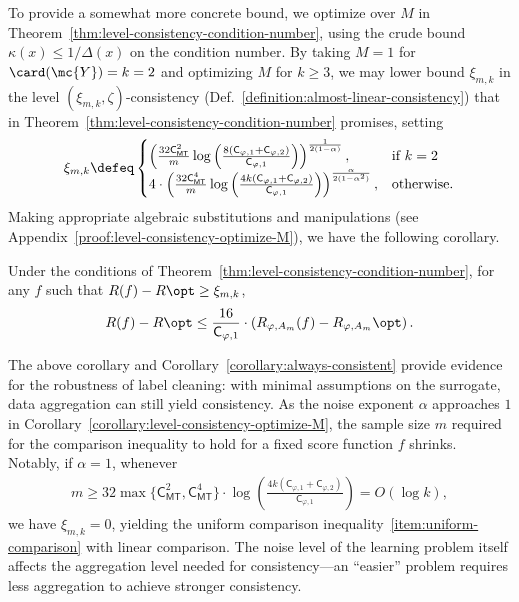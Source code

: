 \documentclass[11pt]{article}
\newcommand{\prn}[1]{\left({#1}\right)} %
\newcommand{\constant}{\mathsf{C}}  %
\newcommand{\cstMT}{\constant_{\mathsf{MT}}}
\newcommand{\sloss}{\varphi}  %
\begin{document}
To provide a somewhat more concrete bound, we optimize
over $M$ in Theorem~\ref{thm:level-consistency-condition-number},
using the crude bound $\kappa(x) \leq 1/\Delta(x)$ on the condition
number.
%
By taking $M=1$ for $\card(\mc{Y}) = k =2$ and optimizing $M$ for $k \geq3$,
we may lower bound $\xi_{m,k}$ in the level $(\xi_{m,k}, \zeta)$-consistency
(Def.~\ref{definition:almost-linear-consistency}) that in
Theorem~\ref{thm:level-consistency-condition-number} promises, setting
\begin{align*}
  \xi_{m,k}
  \defeq \begin{cases}
    \prn{\frac{32 \cstMT^2}{m}\log \prn{ \frac{8(\constant_{\sloss, 1}+\constant_{\sloss, 2})}{\constant_{\sloss, 1}}}}^{\frac{1}{2(1-\alpha)}},
    & \mbox{if}~ k =2
    \\
    4 \cdot  \prn{\frac{32 \cstMT^4}{m}\log \prn{ \frac{4k(\constant_{\sloss, 1}+\constant_{\sloss, 2})}{\constant_{\sloss, 1}}}}^{\frac{\alpha}{2(1-\alpha^2)}},
    & \mbox{otherwise}.
  \end{cases}
\end{align*}
Making appropriate algebraic substitutions and manipulations
(see Appendix~\ref{proof:level-consistency-optimize-M}),
we have the following corollary.
\begin{corollary}
  \label{corollary:level-consistency-optimize-M}
  Under the conditions of
  Theorem~\ref{thm:level-consistency-condition-number}, for any $f$ such
  that $R(f) - R\opt \geq \xi_{m,k}$,
  \begin{align*}
    R(f) - R\opt \leq \frac{16}{\constant_{\sloss, 1}}
    \cdot \prn{R_{\sloss,{A_m}}(f) - R_{\sloss,{A_m}}\opt}.
  \end{align*} 
\end{corollary}

The above corollary and Corollary~\ref{corollary:always-consistent} provide
evidence for the robustness of label cleaning: with minimal assumptions on
the surrogate, data aggregation can still yield consistency.
%
As the noise exponent $\alpha$ approaches $1$ in
Corollary~\ref{corollary:level-consistency-optimize-M}, the sample size $m$
required for the comparison inequality to hold for a fixed score function
$f$ shrinks.
%
Notably, if $\alpha = 1$, whenever
\begin{align*}
  m \geq 32 \max \{\cstMT^2, \cstMT^4\} \cdot \log \prn{ \frac{4k(\constant_{\sloss, 1}+\constant_{\sloss, 2})}{\constant_{\sloss, 1}}}
  = O(\log k),
\end{align*}
we have $\xi_{m,k} = 0$,
yielding the uniform comparison inequality~\eqref{item:uniform-comparison}
with linear comparison.
%
The noise level of the learning problem itself affects the aggregation level
needed for consistency---an ``easier'' problem requires less aggregation to
achieve stronger consistency.
\end{document}
